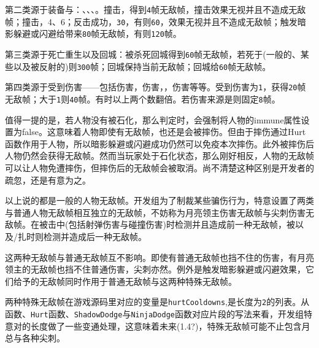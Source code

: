 第二类源于装备与：、、、。撞击，得到\lstinline{4}帧无敌帧，撞击效果无视并且不造成无敌帧；撞击，4、6；反击成功，\lstinline{30}，有则\lstinline{60}，效果无视并且不造成无敌帧；触发暗影躲避或闪避给带来\lstinline{80}帧无敌帧，有则\lstinline{120}帧。

第三类源于死亡重生以及回城：被杀死回城得到\lstinline{60}帧无敌帧，若死于(一般的、某些以及被反射的)则\lstinline{300}帧；回城保持当前无敌帧；回城给\lstinline{60}帧无敌帧。

第四类源于受到伤害——包括伤害，伤害，，伤害等等。受到伤害为\lstinline{1}，获得\lstinline{20}帧无敌帧；大于\lstinline{1}则\lstinline{40}帧。有时以上两个数翻倍。若伤害来源是则固定\lstinline{8}帧。

值得一提的是，若人物没有被石化，那么判定时，会强制将人物的immune属性设置为false。这意味着人物即使有无敌帧，也还是会被摔伤。但由于摔伤通过Hurt函数作用于人物，所以暗影躲避或闪避成功仍然可以免疫本次摔伤。此外被摔伤后人物仍然会获得无敌帧。然而当玩家处于石化状态，那么刚好相反，人物的无敌帧可以让人物免遭摔伤，但摔伤后的无敌帧会被取消。尚不清楚这种区别是开发者的疏忽，还是有意为之。

以上说的都是一般的人物无敌帧。开发组为了制裁某些骗伤行为，特意设置了两类与普通人物无敌帧相互独立的无敌帧，不妨称为月亮领主伤害无敌帧与尖刺伤害无敌帧。在被击中(包括射弹伤害与碰撞伤害)时检测并且造成前一种无敌帧，被以及/扎时则检测并造成后一种无敌帧。

这两种无敌帧与普通无敌帧互不影响。即使有普通无敌帧也挡不住的伤害，有月亮领主的无敌帧也挡不住普通伤害，尖刺亦然。例外是触发暗影躲避或闪避效果，它们给予的无敌帧同时作用于普通无敌帧与这两种特殊无敌帧。

两种特殊无敌帧在游戏源码里对应的变量是\lstinline{hurtCooldowns},是长度为\lstinline{2}的列表。从函数、\lstinline{Hurt}函数、\lstinline{ShadowDodge}与\lstinline{NinjaDodge}函数对应片段的写法来看，开发组特意对的长度做了一些变通处理，这意味着未来(1.4?)，特殊无敌帧可能不止包含月总与各种尖刺。
